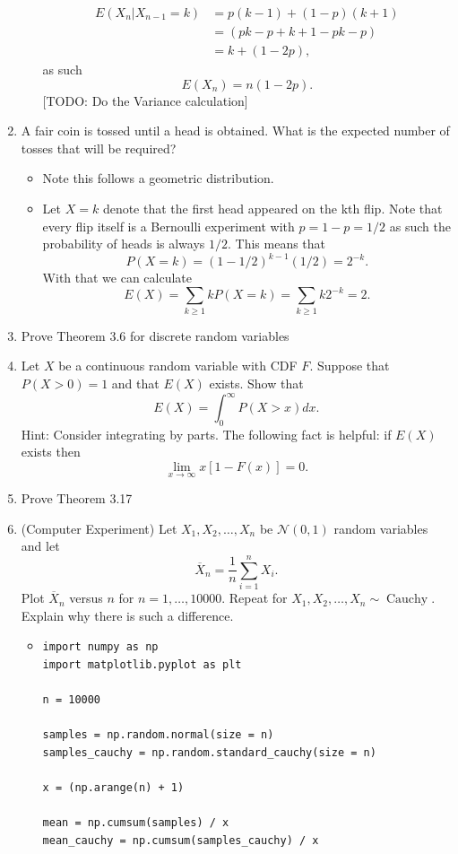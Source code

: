 \documentclass{article}
\begin{document}
\begin{enumerate}
\begin{itemize}
$$\begin{aligned}
			E(X_n|X_{n - 1} = k) &= p(k - 1) + (1 - p)(k + 1) \\
			&= (pk - p + k + 1 - pk - p) \\
			&= k + (1 - 2p),
			\end{aligned}
			$$
			as such
			$$
			E(X_n) = n(1 - 2p).
			$$
			[TODO: Do the Variance calculation]
		\end{itemize}
	\item A fair coin is tossed until a head is obtained. What is the expected number of tosses that will be required?
		\begin{itemize}
			\item Note this follows a geometric distribution.
			\item Let $X = k$ denote that the first head appeared on the kth flip. Note that every flip itself is a Bernoulli experiment with $p = 1 - p = 1/2$ as such the probability of heads is always $1/2$. This means that
			$$
			P(X = k) = (1 - 1/2)^{k - 1}(1 / 2) = 2^{-k}.
			$$
			With that we can calculate
			$$
			E(X) = \sum_{k \geq 1} k P(X = k) = \sum_{k \geq 1} k 2^{-k} = 2.
			$$
		\end{itemize}
	\item Prove Theorem 3.6 for discrete random variables
	\item Let $X$ be a continuous random variable with CDF $F$. Suppose that $P(X > 0) = 1$ and that $E(X)$ exists. Show that
	$$
	E(X) = \int_0^\infty P(X > x) dx.
	$$
	Hint: Consider integrating by parts. The following fact is helpful: if $E(X)$ exists then
	$$
	\lim_{x \rightarrow \infty} x [1 - F(x)] = 0.
	$$
	\item Prove Theorem 3.17
	\item (Computer Experiment) Let $X_1, X_2, \dots, X_n$ be $\mathcal{N}(0, 1)$ random variables and let
	$$
	\overline{X}_n = \frac{1}{n} \sum_{i = 1}^n X_i.
	$$
	Plot $\overline{X}_n$ versus $n$ for $n = 1, \dots, 10000$. Repeat for $X_1, X_2, \dots, X_n \sim \operatorname{Cauchy}$. Explain why there is such a difference.
		\begin{itemize}
			\item
			\begin{verbatim}
import numpy as np
import matplotlib.pyplot as plt

n = 10000

samples = np.random.normal(size = n)
samples_cauchy = np.random.standard_cauchy(size = n)

x = (np.arange(n) + 1)

mean = np.cumsum(samples) / x
mean_cauchy = np.cumsum(samples_cauchy) / x


\end{verbatim}
\end{itemize}
\end{enumerate}
\end{document}
